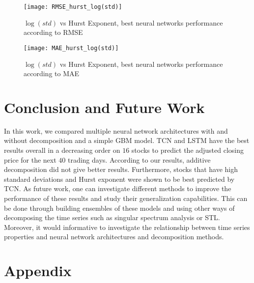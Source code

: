 \documentclass[12pt, A4]{article}
\begin{document}
\begin{figure}[H]
	\centering
	\texttt{[image: RMSE\_hurst\_log(std)]}
	\caption{$\log(std)$ vs Hurst Exponent, best neural networks performance according to RMSE}
	\label{RMSE_hurst_log(std)}
\end{figure}

\begin{figure}[H]
	\centering
	\texttt{[image: MAE\_hurst\_log(std)]}
	\caption{$\log(std)$ vs Hurst Exponent, best neural networks performance according to MAE}
	\label{MAE_hurst_log(std)}
\end{figure}

\section{Conclusion and Future Work}
In this work, we compared multiple neural network architectures with and without decomposition and a simple GBM model. TCN and LSTM have the best results overall in a decreasing order on $16$ stocks to predict the adjusted closing price for the next $40$ trading days. According to our results, additive decomposition did not give better results. Furthermore, stocks that have high standard deviations and Hurst exponent were shown to be best predicted by TCN. As future work, one can investigate different methods to improve the performance of these results and study their generalization capabilities. This can be done through building ensembles of these models and using other ways of decomposing the time series such as singular spectrum analysis or STL.  Moreover, it would informative to investigate the relationship between time series properties and neural network architectures and decomposition methods.




\clearpage

\section{Appendix}
\end{document}
